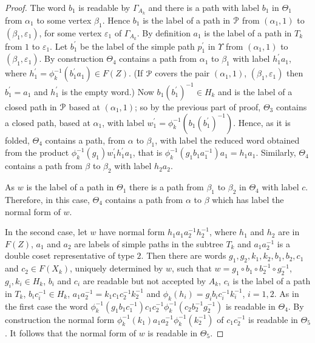 \documentclass[a4paper,12pt]{article}
\renewcommand{\a}{\alpha }
\renewcommand{\b}{\beta }
\newcommand{\G}{\Gamma }
\newcommand{\e}{\varepsilon }
\newcommand{\T}{\Theta }
\newcommand{\U}{\Upsilon }
\newcommand{\cP}{{\cal{P}}}
\numberwithin{equation}{section}
\numberwithin{figure}{section}
\begin{document}
\begin{proof}
The word $b_1$ is readable by $\G_{A_k}$ and there
is a path with label $b_1$ in $\T_1$ from $\a_1$ to some vertex $\b_1$.
Hence $b_1$ is the label of a path in $\cP$ from $(\a_1,1)$ to
$(\b_1,\e_1)$, for some vertex $\e_1$ of $\G_{A_k}$.
By definition $a_1$ is the label of a path in $T_k$ from $1$ to $\e_1$.
Let $b_1^\prime$
 be the label of the simple path $p_1^\prime$ in $\U$ from
$(\a_1,1)$ to $(\b_1,\e_1)$. By construction $\T_4$ contains a path
from $\a_1$ to $\b_1$ with label $h_1^\prime a_1$, where
$h_1^\prime =\phi_k^{-1}(b_1^\prime a_1)\in F(Z)$.
(If $\cP$ covers the pair $(\a_1,1)$, $(\b_1,\e_1)$ then
$b_1^\prime=a_1$ and $h_1^\prime$ is the empty word.)
Now $b_1(b_1^\prime)^{-1}\in H_k$ and is the label of a closed
path  in $\cP$ based at $(\a_1,1)$; so by the
previous part of proof, $\T_3$ contains a closed path, based at $\a_1$,
 with label
$w_1^\prime=\phi_k^{-1}(b_1(b_1^\prime)^{-1})$. Hence, as it is folded,
$\T_4$ contains a path, from $\a$ to $\b_1$,
with label the reduced word obtained from the product
$\phi_k^{-1}(g_1)w_1^{\prime} h_1^\prime a_1$, that is
 $\phi_k^{-1}(g_1b_1a_1^{-1}) a_1=h_1a_1$.
 Similarly, $\T_4$ contains a path from
$\b$ to $\b_2$ with label $h_2a_2$.

As $w$ is the label of a path in $\T_1$ there is a path from $\b_1$ to
$\b_2$ in $\T_4$ with label $c$. Therefore, in this case, $\T_4$ contains
a path from $\a$ to $\b$ which has label the normal form of $w$.

In the second case,
let $w$ have normal form $h_1 a_1 a_2^{-1} h_2^{-1} $, where
$h_1$ and $h_2$ are in $F(Z)$,  $a_1$ and $a_2$ are labels
of simple paths in the subtree $T_k$ and $a_1a_2^{-1}$ is a double coset
representative of type $2$. Then there are words
$g_1, g_2, k_1, k_2, b_1, b_2, c_1$ and $c_2\in F(X_k)$, uniquely
determined by $w$,  such that
$w=g_1\circ b_1 \circ b_2^{-1}\circ g_2^{-1}$,
$g_i, k_i\in H_k$, $b_i$ and $c_i$ are
readable but not accepted by  $A_k$, $c_i$ is the label of
a path in $T_k$, $b_ic_i^{-1}\in H_k$, $a_1a_2^{-1}=k_1c_1c_2^{-1}k_2^{-1}$
 and
$\phi_k(h_i)=g_ib_ic_i^{-1}k_i^{-1}$, $i=1,2$.
As in the first case the word $\phi_k^{-1}(g_1b_1c_1^{-1})c_1 c_2^{-1}
\phi_k^{-1}(c_2b_2^{-1}g_2^{-1})$ is readable in $\T_4$. By construction the
normal form $\phi_k^{-1}(k_1)a_1a_2^{-1}\phi_k^{-1}(k_2^{-1})$ of $c_1 c_2^{-1}$ is readable in
$\T_5$. It follows that the normal form of $w$ is readable in $\T_5$.
\end{proof}
\end{document}
